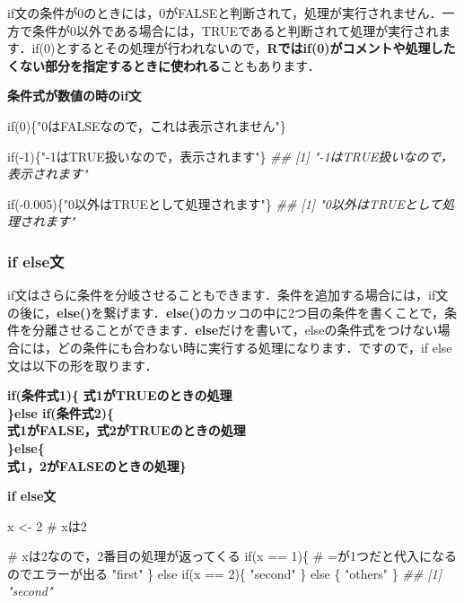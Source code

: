 \documentclass[
  letterpaper,
  DIV=11,
  numbers=noendperiod]{scrreprt}
\newenvironment{Shaded}{\begin{snugshade}}{\end{snugshade}}
\newcommand{\CommentTok}[1]{\textcolor[rgb]{0.37,0.37,0.37}{#1}}
\newcommand{\ControlFlowTok}[1]{\textcolor[rgb]{0.00,0.23,0.31}{#1}}
\newcommand{\DecValTok}[1]{\textcolor[rgb]{0.68,0.00,0.00}{#1}}
\newcommand{\DocumentationTok}[1]{\textcolor[rgb]{0.37,0.37,0.37}{\textit{#1}}}
\newcommand{\FloatTok}[1]{\textcolor[rgb]{0.68,0.00,0.00}{#1}}
\newcommand{\NormalTok}[1]{\textcolor[rgb]{0.00,0.23,0.31}{#1}}
\newcommand{\OtherTok}[1]{\textcolor[rgb]{0.00,0.23,0.31}{#1}}
\newcommand{\SpecialCharTok}[1]{\textcolor[rgb]{0.37,0.37,0.37}{#1}}
\newcommand{\StringTok}[1]{\textcolor[rgb]{0.13,0.47,0.30}{#1}}
\begin{document}
if文の条件が0のときには，0がFALSEと判断されて，処理が実行されません．一方で条件が0以外である場合には，TRUEであると判断されて処理が実行されます．if(0)とするとその処理が行われないので，\textbf{Rではif(0)がコメントや処理したくない部分を指定するときに使われる}こともあります．

\textbf{条件式が数値の時のif文}

\begin{Shaded}
\begin{Highlighting}[]
\ControlFlowTok{if}\NormalTok{(}\DecValTok{0}\NormalTok{)\{}\StringTok{"0はFALSEなので，これは表示されません"}\NormalTok{\}}

\ControlFlowTok{if}\NormalTok{(}\SpecialCharTok{{-}}\DecValTok{1}\NormalTok{)\{}\StringTok{"{-}1はTRUE扱いなので，表示されます"}\NormalTok{\}}
\DocumentationTok{\#\# [1] "{-}1はTRUE扱いなので，表示されます"}

\ControlFlowTok{if}\NormalTok{(}\SpecialCharTok{{-}}\FloatTok{0.005}\NormalTok{)\{}\StringTok{"0以外はTRUEとして処理されます"}\NormalTok{\}}
\DocumentationTok{\#\# [1] "0以外はTRUEとして処理されます"}
\end{Highlighting}
\end{Shaded}

\hypertarget{if-elseux6587}{%
\subsubsection{if else文}\label{if-elseux6587}}

if文はさらに条件を分岐させることもできます．条件を追加する場合には，if文の後に，\textbf{else()}を繋げます．\textbf{else()}のカッコの中に2つ目の条件を書くことで，条件を分離させることができます．\textbf{else}だけを書いて，elseの条件式をつけない場合には，どの条件にも合わない時に実行する処理になります．ですので，if
else文は以下の形を取ります．

\textbf{if(条件式1)\{} \textbf{式1がTRUEのときの処理}\\
\textbf{\}else if(条件式2)\{}\\
\textbf{式1がFALSE，式2がTRUEのときの処理}\\
\textbf{\}else\{}\\
\textbf{式1，2がFALSEのときの処理\}}

\textbf{if else文}

\begin{Shaded}
\begin{Highlighting}[]
\NormalTok{x }\OtherTok{\textless{}{-}} \DecValTok{2} \CommentTok{\# xは2}

\CommentTok{\# xは2なので，2番目の処理が返ってくる}
\ControlFlowTok{if}\NormalTok{(x }\SpecialCharTok{==} \DecValTok{1}\NormalTok{)\{   }\CommentTok{\# =が1つだと代入になるのでエラーが出る}
  \StringTok{"first"}
\NormalTok{\} }\ControlFlowTok{else} \ControlFlowTok{if}\NormalTok{(x }\SpecialCharTok{==} \DecValTok{2}\NormalTok{)\{}
  \StringTok{"second"}
\NormalTok{\} }\ControlFlowTok{else}\NormalTok{ \{}
  \StringTok{"others"}
\NormalTok{\}}
\DocumentationTok{\#\# [1] "second"}
\end{Highlighting}
\end{Shaded}
\end{document}
